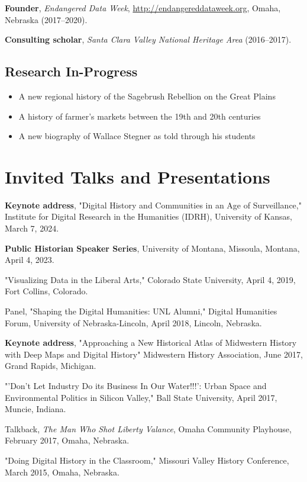 \documentclass[10pt]{article}
\begin{document}
\textbf{Founder}, \textit{Endangered Data Week}, \url{http://endangereddataweek.org}, Omaha, Nebraska (2017--2020).

\textbf{Consulting scholar}, \textit{Santa Clara Valley National Heritage Area} (2016--2017).

\subsection*{Research In-Progress}\label{in-progress}

\begin{itemize}
\item A new regional history of the Sagebrush Rebellion on the Great Plains
\item A history of farmer's markets between the 19th and 20th centuries
\item A new biography of Wallace Stegner as told through his students
\end{itemize}

\section{Invited Talks and Presentations}

\textbf{Keynote address}, "Digital History and Communities in an Age of Surveillance," Institute for Digital Research in the Humanities (IDRH), University of Kansas, March 7, 2024.

\textbf{Public Historian Speaker Series}, University of Montana, Missoula, Montana, April 4, 2023.

"Visualizing Data in the Liberal Arts," Colorado State University, April 4, 2019, Fort Collins, Colorado.

Panel, "Shaping the Digital Humanities: UNL Alumni," Digital Humanities Forum, University of Nebraska-Lincoln, April 2018, Lincoln, Nebraska.

\textbf{Keynote address}, "Approaching a New Historical Atlas of Midwestern History with Deep Maps and Digital History" Midwestern History Association, June 2017, Grand Rapids, Michigan.

"'Don't Let Industry Do its Business In Our Water!!!': Urban Space and Environmental Politics in Silicon Valley," Ball State University, April 2017, Muncie, Indiana.

Talkback, \textit{The Man Who Shot Liberty Valance}, Omaha Community Playhouse, February 2017, Omaha, Nebraska.

"Doing Digital History in the Classroom," Missouri Valley History Conference, March 2015, Omaha, Nebraska.
\end{document}
